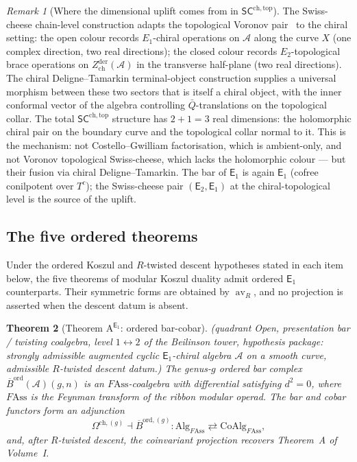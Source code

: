 \documentclass[11pt,reqno]{amsart}
\newtheorem{theorem}{Theorem}[section]
\theoremstyle{definition}
\theoremstyle{remark}
\newtheorem{remark}[theorem]{Remark}
\newcommand{\cA}{\mathcal{A}}
\newcommand{\SCchtop}{\mathsf{SC}^{\mathrm{ch,top}}}
\newcommand{\Eone}{\mathsf{E}_{1}}
\newcommand{\Etwo}{\mathsf{E}_{2}}
\newcommand{\Ass}{\mathrm{Ass}}
\DeclareMathOperator{\av}{av}
\newcommand{\Barord}{\overline{B}^{\mathrm{ord}}}
\newcommand{\FMAss}{F\!\Ass}
\numberwithin{equation}{section}
\begin{document}
\begin{remark}[Where the dimensional uplift comes from in
$\SCchtop$]
\label{rem:uplift-mechanism-source}
The Swiss-cheese chain-level construction adapts the topological
Voronov pair~\cite{Voronov99} to the chiral setting: the open
colour records $E_1$-chiral operations on $\cA$ along the curve
$X$ (one complex direction, two real directions); the closed
colour records $E_2$-topological brace operations on
$Z^{\mathrm{der}}_{\mathrm{ch}}(\cA)$ in the transverse half-plane
(two real directions). The chiral Deligne--Tamarkin terminal-object
construction supplies a universal morphism between these two
sectors that is itself a chiral object, with the inner conformal
vector of the algebra controlling $\bar Q$-translations on the
topological collar. The total $\SCchtop$ structure has
$2 + 1 = 3$ real dimensions: the holomorphic chiral pair on the
boundary curve and the topological collar normal to it. This is
the mechanism: not Costello--Gwilliam factorisation, which is
ambient-only, and not Voronov topological Swiss-cheese, which lacks
the holomorphic colour --- but their fusion via chiral
Deligne--Tamarkin. The bar of $\Eone$ is again $\Eone$ (cofree
conilpotent over $T^c$); the Swiss-cheese pair $(\Etwo, \Eone)$ at
the chiral-topological level is the source of the uplift.
\end{remark}

\subsection{The five ordered theorems}

Under the ordered Koszul and \(R\)-twisted descent hypotheses stated in
each item below, the five theorems of modular Koszul duality admit
ordered $\Eone$ counterparts. Their symmetric forms are obtained by
\(\av_R\), and no projection is asserted when the descent datum is absent.

\begin{theorem}[Theorem $\mathrm{A}^{\Eone}$: ordered bar-cobar]
\label{thm:ordered-A}
\textup{(}\emph{quadrant} Open, \emph{presentation} bar / twisting
coalgebra, \emph{level} $1 \leftrightarrow 2$ of the Beilinson
tower, \emph{hypothesis package}: strongly admissible augmented
cyclic $\Eone$-chiral algebra $\cA$ on a smooth curve, admissible
$R$-twisted descent datum.\textup{)}
The genus-$g$ ordered bar complex
$\Barord(\cA)(g,n)$ is an $\FMAss$-coalgebra with differential
satisfying $d^2 = 0$, where $\FMAss$ is the Feynman transform of
the ribbon modular operad. The bar and cobar functors form an
adjunction
\[
  \Omega^{\mathrm{ch},(g)} \dashv \overline{B}^{\mathrm{ord},(g)}\colon
  \mathrm{Alg}_{\FMAss} \rightleftarrows
  \mathrm{CoAlg}_{\FMAss},
\]
and, after \(R\)-twisted descent, the coinvariant projection recovers
Theorem~A of Volume~I.
\end{theorem}
\end{document}
